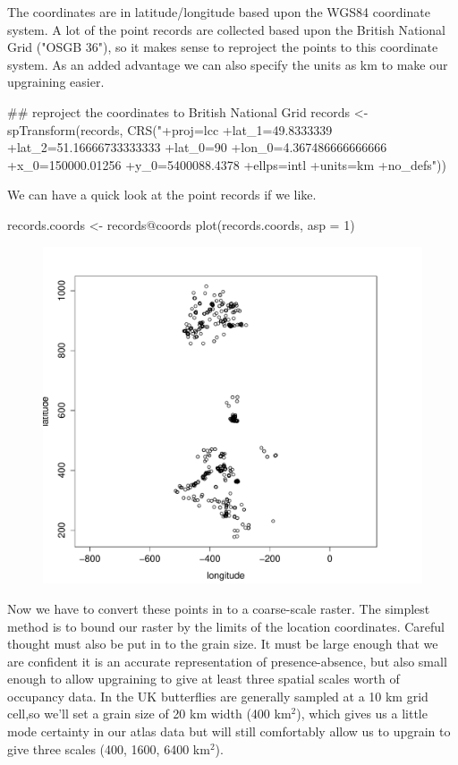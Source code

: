 \documentclass{article}[12pt, a4paper]
\begin{document}
The coordinates are in latitude/longitude based upon the WGS84 coordinate system. A lot of the point records are collected based upon the British National Grid ("OSGB 36"), so it makes sense to reproject the points to this coordinate system. As an added advantage we can also specify the units as km to make our upgraining easier.

\begin{Schunk}
\begin{Sinput}
## reproject the coordinates to British National Grid
records <- spTransform(records,
                       CRS("+proj=lcc +lat_1=49.8333339 +lat_2=51.16666733333333
                           +lat_0=90 +lon_0=4.367486666666666 +x_0=150000.01256 
                           +y_0=5400088.4378 +ellps=intl +units=km +no_defs"))
\end{Sinput}
\end{Schunk}

We can have a quick look at the point records if we like.

\begin{Schunk}
\begin{Sinput}
records.coords <- records@coords
plot(records.coords, asp = 1)
\end{Sinput}
\end{Schunk}

\begin{figure}[!ht]
\centering
\includegraphics[width=12cm]{Downscaling-downscale30}
\end{figure}

\newpage
Now we have to convert these points in to a coarse-scale raster. The simplest method is to bound our raster by the limits of the location coordinates. Careful thought must also be put in to the grain size. It must be large enough that we are confident it is an accurate representation of presence-absence, but also small enough to allow upgraining to give at least three spatial scales worth of occupancy data. In the UK butterflies are generally sampled at a 10 km grid cell,so we'll set a grain size of 20 km width (400 km$^2$), which gives us a little mode certainty in our atlas data but will still comfortably allow us to upgrain to give three scales (400, 1600, 6400 km$^2$).
\end{document}
